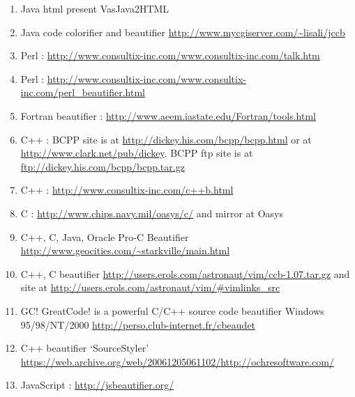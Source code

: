 \begin{sloppypar}
\begin{myquote}
\begin{enumerate}[nolistsep,leftmargin=*]
        \item Java html present VasJava2HTML
        \item Java code colorifier and beautifier \url{http://www.mycgiserver.com/~lisali/jccb}
        \item Perl : \url{http://www.consultix-inc.com/www.consultix-inc.com/talk.htm}
        \item Perl : \url{http://www.consultix-inc.com/www.consultix-inc.com/perl_beautifier.html}
        \item Fortran beautifier : \url{http://www.aeem.iastate.edu/Fortran/tools.html}

        \item C++ : BCPP site is at \url{http://dickey.his.com/bcpp/bcpp.html} or at \url{http://www.clark.net/pub/dickey}.
        BCPP ftp site is at \url{ftp://dickey.his.com/bcpp/bcpp.tar.gz}

        \item C++ : \url{http://www.consultix-inc.com/c++b.html}
        \item C : \url{http://www.chips.navy.mil/oasys/c/} and mirror at Oasys
        \item C++, C, Java, Oracle Pro-C Beautifier \url{http://www.geocities.com/~starkville/main.html}

        \item C++, C beautifier \url{http://users.erols.com/astronaut/vim/ccb-1.07.tar.gz} and site at
        \url{http://users.erols.com/astronaut/vim/#vimlinks_src}

        \item GC! GreatCode! is a powerful C/C++ source code beautifier Windows 95/98/NT/2000
        \url{http://perso.club-internet.fr/cbeaudet}

        \item C++ beautifier `SourceStyler' \url{https://web.archive.org/web/20061205061102/http://ochresoftware.com/}
        \item JavaScript : \url{http://jsbeautifier.org/}

    \end{enumerate}
    \end{myquote}
    \end{sloppypar}

